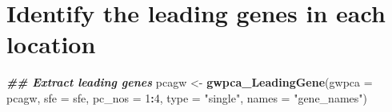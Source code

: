\documentclass[
]{book}
\newenvironment{Shaded}{\begin{snugshade}}{\end{snugshade}}
\newcommand{\AttributeTok}[1]{\textcolor[rgb]{0.13,0.29,0.53}{#1}}
\newcommand{\DecValTok}[1]{\textcolor[rgb]{0.00,0.00,0.81}{#1}}
\newcommand{\DocumentationTok}[1]{\textcolor[rgb]{0.56,0.35,0.01}{\textbf{\textit{#1}}}}
\newcommand{\FunctionTok}[1]{\textcolor[rgb]{0.13,0.29,0.53}{\textbf{#1}}}
\newcommand{\NormalTok}[1]{#1}
\newcommand{\OtherTok}[1]{\textcolor[rgb]{0.56,0.35,0.01}{#1}}
\newcommand{\SpecialCharTok}[1]{\textcolor[rgb]{0.81,0.36,0.00}{\textbf{#1}}}
\newcommand{\StringTok}[1]{\textcolor[rgb]{0.31,0.60,0.02}{#1}}
\begin{document}
\hypertarget{identify-the-leading-genes-in-each-location}{%
\section{Identify the leading genes in each location}\label{identify-the-leading-genes-in-each-location}}

\begin{Shaded}
\begin{Highlighting}[]
\DocumentationTok{\#\# Extract leading genes}
\NormalTok{pcagw }\OtherTok{\textless{}{-}} \FunctionTok{gwpca\_LeadingGene}\NormalTok{(}\AttributeTok{gwpca =}\NormalTok{ pcagw, }
                           \AttributeTok{sfe =}\NormalTok{ sfe, }
                           \AttributeTok{pc\_nos =} \DecValTok{1}\SpecialCharTok{:}\DecValTok{4}\NormalTok{, }
                           \AttributeTok{type =} \StringTok{"single"}\NormalTok{, }
                           \AttributeTok{names =} \StringTok{"gene\_names"}\NormalTok{)}
\end{Highlighting}
\end{Shaded}
\end{document}
